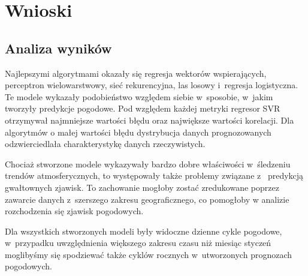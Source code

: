 


\section{Wnioski}

\subsection{Analiza wyników}

Najlepszymi algorytmami okazały się regresja wektorów wspierających, perceptron
wielowarstwowy, sieć rekurencyjna, las losowy i~regresja logistyczna. Te modele
wykazały podobieństwo względem siebie w~sposobie, w~jakim tworzyły predykcje 
pogodowe. Pod względem każdej metryki regresor SVR otrzymywał najmniejsze 
wartości błędu oraz największe wartości korelacji. Dla algorytmów 
o małej wartości błędu dystrybucja danych prognozowanych odzwierciedlała
charakterystykę danych rzeczywistych.

Chociaż stworzone modele wykazywały bardzo dobre właściwości w~śledzeniu
trendów atmosferycznych, to występowały także problemy związane z~
predykcją gwałtownych zjawisk. To zachowanie mogłoby zostać zredukowane
poprzez zawarcie danych z~szerszego zakresu geograficznego, co pomogłoby 
w analizie rozchodzenia się zjawisk pogodowych. 

Dla wszystkich stworzonych modeli były widoczne dzienne cykle pogodowe, w~przypadku
uwzględnienia większego zakresu czasu niż miesiąc styczeń moglibyśmy się spodziewać
także cyklów rocznych w~utworzonych prognozach pogodowych.

